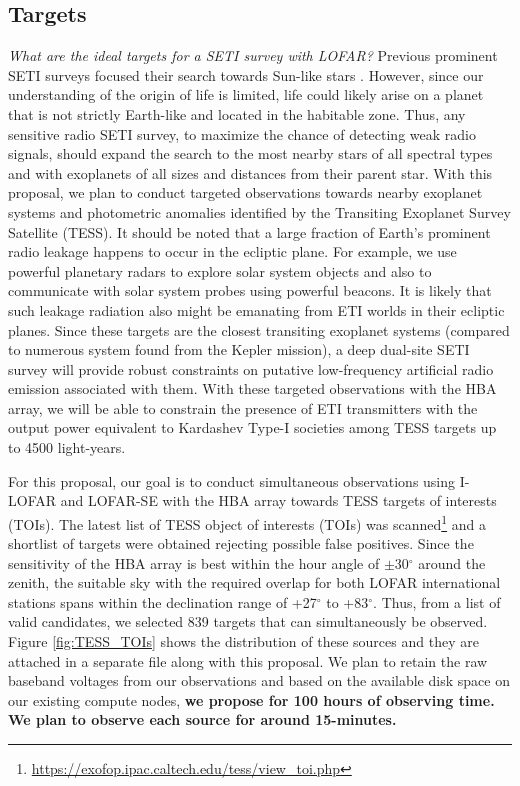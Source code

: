 \documentclass{aastex63}
\begin{document}
\subsection{Targets}
{\itshape What are the ideal targets for a SETI survey with LOFAR?} Previous prominent SETI surveys focused their search towards Sun-like stars \citep{Tarter:1996jf}. However, since our understanding of the origin of life is limited, life could likely arise on a planet that is not strictly Earth-like and located in the habitable zone. Thus, any sensitive radio SETI survey, to maximize the chance of detecting weak radio signals, should expand the search to the most nearby stars of all spectral types and with exoplanets of all sizes and distances from their parent star. With this proposal, we plan to conduct targeted observations towards nearby exoplanet systems and photometric anomalies identified by the Transiting Exoplanet Survey Satellite (TESS). It should be noted that a large fraction of Earth's prominent radio leakage happens to occur in the ecliptic plane. For example, we use powerful planetary radars to explore solar system objects and also to communicate with solar system probes using powerful beacons. It is likely that such leakage radiation also might be emanating from ETI worlds in their ecliptic planes. Since these targets are the closest transiting exoplanet systems (compared to numerous system found from the Kepler mission), a deep dual-site SETI survey will provide robust constraints on putative low-frequency artificial radio emission associated with them. With these targeted observations with the HBA array, we will be able to constrain the presence of ETI transmitters with the output power equivalent to Kardashev Type-I societies among TESS targets up to 4500 light-years. 

For this proposal, our goal is to conduct simultaneous observations using I-LOFAR and LOFAR-SE with the HBA array towards TESS targets of interests (TOIs). The latest list of TESS object of interests (TOIs) was  scanned\footnote{\url{https://exofop.ipac.caltech.edu/tess/view_toi.php}} and a shortlist of targets were obtained rejecting possible false positives. Since the sensitivity of the HBA array is best within the hour angle of $\pm$30$^\circ$ around the zenith, the suitable sky with the required overlap for both LOFAR international stations spans within the declination range of +27$^\circ$ to +83$^\circ$.  Thus, from a list of valid candidates, we selected 839 targets that can simultaneously be observed. Figure \ref{fig:TESS_TOIs} shows the distribution of these sources and they are attached in a separate file along with this proposal.  We plan to retain the raw baseband voltages from our observations and based on the available disk space on our existing compute nodes, {\bf we propose for 100 hours of observing time. We plan to observe each source for around 15-minutes.} 
\end{document}
